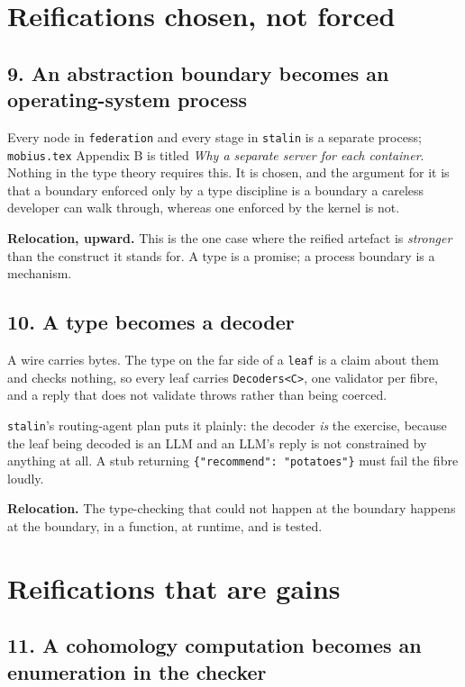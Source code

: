 \documentclass[11pt,a4paper]{article}
\begin{document}
\section{Reifications chosen, not forced}

\subsection*{9. An abstraction boundary becomes an operating-system process}

Every node in \texttt{federation} and every stage in \texttt{stalin} is a
separate process; \texttt{mobius.tex} Appendix B is titled \emph{Why a separate
server for each container}. Nothing in the type theory requires this. It is
chosen, and the argument for it is that a boundary enforced only by a type
discipline is a boundary a careless developer can walk through, whereas one
enforced by the kernel is not.

\textbf{Relocation, upward.} This is the one case where the reified artefact is
\emph{stronger} than the construct it stands for. A type is a promise; a process
boundary is a mechanism.

\subsection*{10. A type becomes a decoder}

A wire carries bytes. The type on the far side of a \texttt{leaf} is a claim
about them and checks nothing, so every leaf carries \texttt{Decoders<C>}, one
validator per fibre, and a reply that does not validate throws rather than
being coerced.

\texttt{stalin}'s routing-agent plan puts it plainly: the decoder \emph{is} the
exercise, because the leaf being decoded is an LLM and an LLM's reply is not
constrained by anything at all. A stub returning \texttt{\{"recommend":
"potatoes"\}} must fail the fibre loudly.

\textbf{Relocation.} The type-checking that could not happen at the boundary
happens at the boundary, in a function, at runtime, and is tested.

\section{Reifications that are gains}

\subsection*{11. A cohomology computation becomes an enumeration in the checker}
\end{document}

